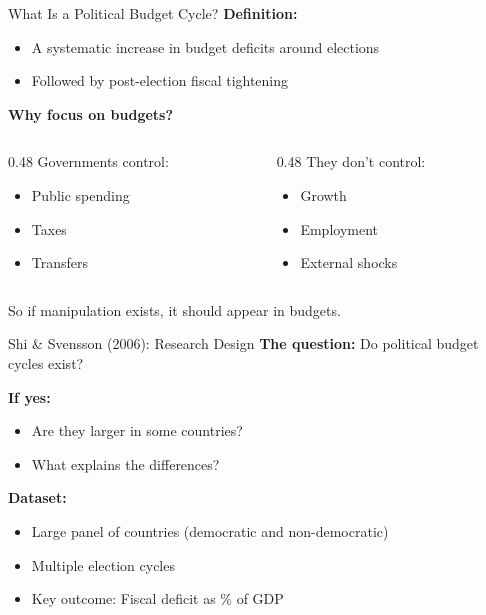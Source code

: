 \documentclass[10pt]{beamer}
\begin{document}
\begin{frame}{What Is a Political Budget Cycle?}
\textbf{Definition:}
\begin{itemize}
\item A systematic increase in budget deficits around elections
\item Followed by post-election fiscal tightening
\end{itemize}

\vspace{0.3cm}
\textbf{Why focus on budgets?}

\begin{columns}
\begin{column}{0.48\textwidth}
Governments control:
\begin{itemize}
\item Public spending
\item Taxes
\item Transfers
\end{itemize}
\end{column}

\begin{column}{0.48\textwidth}
They don't control:
\begin{itemize}
\item Growth
\item Employment
\item External shocks
\end{itemize}
\end{column}
\end{columns}

\vspace{0.3cm}
\alert{So if manipulation exists, it should appear in budgets.}
\end{frame}

\begin{frame}{Shi \& Svensson (2006): Research Design}
\textbf{The question:} Do political budget cycles exist?

\vspace{0.2cm}
\textbf{If yes:}
\begin{itemize}
\item Are they larger in some countries?
\item What explains the differences?
\end{itemize}

\vspace{0.3cm}
\textbf{Dataset:}
\begin{itemize}
\item Large panel of countries (democratic and non-democratic)
\item Multiple election cycles
\item Key outcome: Fiscal deficit as \% of GDP
\end{itemize}
\end{frame}
\end{document}

